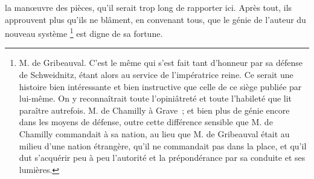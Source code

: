 \documentclass[french,twoside]{book} %
\begin{document}
la manœuvre des pièces, qu’il serait trop long de rapporter ici. Après tout, ils approuvent plus qu’ils ne blâment, en convenant tous, que le génie de l’auteur du nouveau système
\label{footnote8}\footnote{M. de Gribeauval. C’est le même qui s’est fait tant d’honneur par sa défense de Schweidnitz, étant alors au service de l’impératrice reine. Ce serait une histoire bien intéressante et bien instructive que celle de ce siège publiée par lui-même. On y reconnaîtrait toute l’opiniâtreté et toute l’habileté que lit paraître autrefois. M. de Chamilly à Grave ; et bien plus de génie encore dans les moyens de défense, outre cette différence sensible que M. de Chamilly commandait à sa nation, au lieu que M. de Gribeauval était au milieu d’une nation étrangère, qu’il ne commandait pas dans la place, et qu’il dut s’acquérir peu à peu l’autorité et la prépondérance par sa conduite et ses lumières.} est digne de sa fortune.
\end{document}
